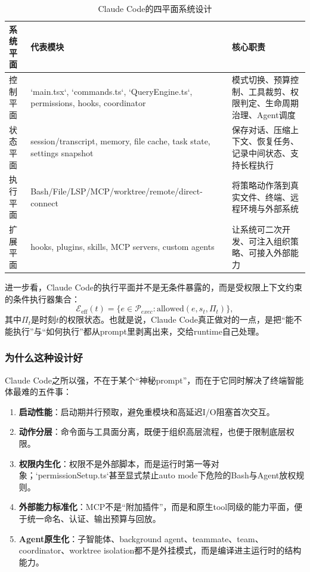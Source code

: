 \documentclass[12pt,a4paper]{article}
\begin{document}
\begin{table}[H]
\centering
\caption{Claude Code的四平面系统设计}
\begin{tabular}{p{2.8cm}p{4.0cm}p{5.2cm}}
\toprule
\textbf{系统平面} & \textbf{代表模块} & \textbf{核心职责} \\
\midrule
控制平面 & `main.tsx`, `commands.ts`, `QueryEngine.ts`, permissions, hooks, coordinator & 模式切换、预算控制、工具裁剪、权限判定、生命周期治理、Agent调度 \\
状态平面 & session/transcript, memory, file cache, task state, settings snapshot & 保存对话、压缩上下文、恢复任务、记录中间状态、支持长程执行 \\
执行平面 & Bash/File/LSP/MCP/worktree/remote/direct-connect & 将策略动作落到真实文件、终端、远程环境与外部系统 \\
扩展平面 & hooks, plugins, skills, MCP servers, custom agents & 让系统可二次开发、可注入组织策略、可接入外部能力 \\
\bottomrule
\end{tabular}
\end{table}

进一步看，Claude Code的执行平面并不是无条件暴露的，而是受权限上下文约束的条件执行器集合：
\begin{equation}
\mathcal{E}_{\text{eff}}(t)=\{e \in \mathcal{P}_{exec} : \mathrm{allowed}(e,s_t,\Pi_t)\},
\end{equation}
其中$\Pi_t$是时刻$t$的权限状态。也就是说，Claude Code真正做对的一点，是把“能不能执行”与“如何执行”都从prompt里剥离出来，交给runtime自己处理。

\subsubsection{为什么这种设计好}

Claude Code之所以强，不在于某个“神秘prompt”，而在于它同时解决了终端智能体最难的五件事：
\begin{enumerate}
    \item \textbf{启动性能}：启动期并行预取，避免重模块和高延迟I/O阻塞首次交互。
    \item \textbf{动作分层}：命令面与工具面分离，既便于组织高层流程，也便于限制底层权限。
    \item \textbf{权限内生化}：权限不是外部脚本，而是运行时第一等对象；`permissionSetup.ts`甚至显式禁止auto mode下危险的Bash与Agent放权规则。
    \item \textbf{外部能力标准化}：MCP不是“附加插件”，而是和原生tool同级的能力平面，便于统一命名、认证、输出预算与回放。
    \item \textbf{Agent原生化}：子智能体、background agent、teammate、team、coordinator、worktree isolation都不是外挂模式，而是编译进主运行时的结构能力。
\end{enumerate}
\end{document}

